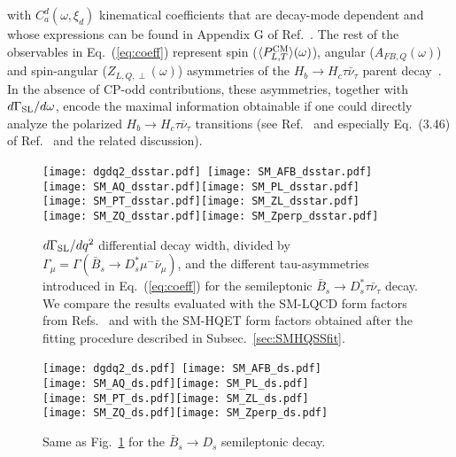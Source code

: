 \documentclass[aps,superscriptaddress,showpacs,nofootinbib,11pt]{revtex4-1}
\begin{document}
%
with  $C^d_a(\omega,\xi_d)$  kinematical coefficients that are decay-mode dependent and whose expressions can be found in
  Appendix G of Ref.~\cite{Penalva:2021wye}.  The rest of the observables in Eq.~(\ref{eq:coeff}) represent
  spin ($\langle P^{\rm CM}_{L,T}\rangle(\omega)$), angular  
 ($A_{FB,Q}(\omega)$) and spin-angular ($Z_{L,Q,\perp}(\omega)$)  asymmetries of the 
 $H_b\to H_c\tau\bar\nu_\tau$ parent decay~\cite{Penalva:2021wye}.
In the absence of CP-odd contributions, 
 these asymmetries, together with $d\Gamma_{\rm SL}/d\omega$, encode  
 the maximal information obtainable if one could directly analyze the polarized 
 $H_b\to H_c \tau \bar\nu_\tau$  transitions (see Ref.~\cite{Penalva:2021gef} and especially 
 Eq.~(3.46) of Ref.~\cite{Penalva:2021wye} and the related discussion). 
%
\begin{figure}
\begin{center}
\texttt{[image: dgdq2\_dsstar.pdf]}\ \texttt{[image: SM\_AFB\_dsstar.pdf]}\\
\texttt{[image: SM\_AQ\_dsstar.pdf]}\texttt{[image: SM\_PL\_dsstar.pdf]}\\
\texttt{[image: SM\_PT\_dsstar.pdf]}\texttt{[image: SM\_ZL\_dsstar.pdf]}\\
\texttt{[image: SM\_ZQ\_dsstar.pdf]}\texttt{[image: SM\_Zperp\_dsstar.pdf]}
\caption{ $d\Gamma_{\rm SL}/dq^2$ differential decay width, divided by $\Gamma_\mu=\Gamma(\bar B_s\to D_s^*\mu^-\bar\nu_\mu)$, and  the different tau-asymmetries
introduced in Eq.~(\ref{eq:coeff}) for the semileptonic $\bar B_s\to D_s^* \tau \bar\nu_\tau$ decay. We compare  the results evaluated with the SM-LQCD form factors from 
Refs.~\cite{Harrison:2021tol,McLean:2019qcx} and  with the  SM-HQET form factors obtained after the
fitting procedure described in Subsec.~\ref{sec:SMHQSSfit}.}
\label{fig:dsstarsmasi}
\end{center}
\end{figure}%
%
\begin{figure}
\begin{center}
\texttt{[image: dgdq2\_ds.pdf]}\ \texttt{[image: SM\_AFB\_ds.pdf]}\\
\texttt{[image: SM\_AQ\_ds.pdf]}\texttt{[image: SM\_PL\_ds.pdf]}\\
\texttt{[image: SM\_PT\_ds.pdf]}\texttt{[image: SM\_ZL\_ds.pdf]}\\
\texttt{[image: SM\_ZQ\_ds.pdf]}\texttt{[image: SM\_Zperp\_ds.pdf]}
\caption{ Same as Fig.~\ref{fig:dsstarsmasi} for the $\bar B_s\to D_s$ semileptonic decay.}
\label{fig:dssmasi}
\end{center}
\end{figure}%
\end{document}
